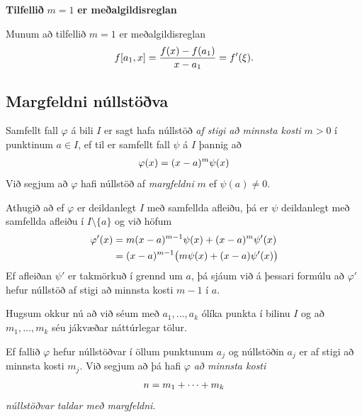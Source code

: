 \documentclass[A4paper,10pt,icelandic]{sphinxmanual}
\begin{document}
\textbf{Tilfellið} \(m=1\) \textbf{er meðalgildisreglan}

Munum að tilfellið \(m=1\) er meðalgildisreglan
\begin{gather}
\begin{split}f[a_1,x]=\dfrac{f(x)-f(a_1)}{x-a_1}=f'(\xi).\end{split}\notag
\end{gather}

\subsection{Margfeldni núllstöðva}
\label{kafli03:margfeldni-nullstova}
Samfellt fall \(\varphi\) á bili \(I\) er sagt hafa núllstöð \emph{af
stigi að minnsta kosti} \(m>0\) í punktinum \(a\in I\), ef til
er samfellt fall \(\psi\) á \(I\) þannig að
\begin{gather}
\begin{split}\varphi(x)=(x-a)^m\psi(x)\end{split}\notag
\end{gather}
Við segjum að \(\varphi\) hafi núllstöð af \emph{margfeldni} \(m\) ef
\(\psi(a)\neq0\).

Athugið að ef \(\varphi\) er deildanlegt \(I\) með samfellda
afleiðu, þá er \(\psi\) deildanlegt með samfellda afleiðu í
\(I\setminus\{a\}\) og við höfum
\begin{gather}
\begin{split}\begin{aligned}
  \varphi'(x)&=m(x-a)^{m-1}\psi(x)+(x-a)^m\psi'(x)\\
&= (x-a)^{m-1} \big(m\psi(x)+(x-a)\psi'(x)\big)\end{aligned}\end{split}\notag
\end{gather}
Ef afleiðan \(\psi'\) er takmörkuð í grennd um \(a\), þá sjáum
við á þessari formúlu að \(\varphi'\) hefur núllstöð af stigi að
minnsta kosti \(m-1\) í \(a\).

Hugsum okkur nú að við séum með \(a_1,\dots,a_k\) ólíka punkta í
bilinu \(I\) og að \(m_1,\dots,m_k\) séu jákvæðar náttúrlegar
tölur.

Ef fallið \(\varphi\) hefur núllstöðvar í öllum punktunum
\(a_j\) og núllstöðin \(a_j\) er af stigi að minnsta kosti
\(m_j\). Við segjum að þá hafi \(\varphi\) \emph{að minnsta kosti}
\begin{gather}
\begin{split}n=m_1+\cdots+m_k\end{split}\notag
\end{gather}
\emph{núllstöðvar taldar með margfeldni}.
\end{document}
